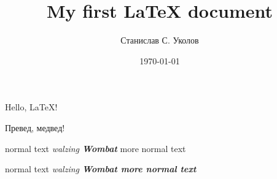 \documentclass[12pt]{article}
\begin{document}
\title{My first \LaTeX{} document}
\author{Станислав С. Уколов}
\date{\today}
\maketitle

\vfill

Hello, \hfill\LaTeX{}!

Превед, медвед!

\pagebreak 

normal text {\itshape walzing \bfseries Wombat} more normal text

normal text \bgroup\itshape walzing \bfseries Wombat\egroup{} more normal text
\end{document}
